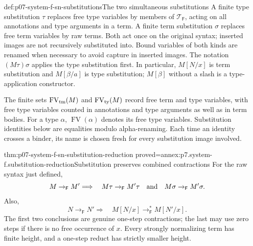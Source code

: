 \begin{hbdefinition}{def:p07-system-f-sn-substitutions}{The two simultaneous substitutions}
A finite type substitution \(\tau\) replaces free type variables by
members of \(\mathcal T_{\mathsf F}\), acting on all annotations and
type arguments in a term. A finite term substitution \(\sigma\) replaces
free term variables by raw terms. Both act once on the original syntax;
inserted images are not recursively substituted into. Bound variables of
both kinds are renamed when necessary to avoid capture in inserted images.
The notation \((M\tau)\sigma\) applies the type substitution first.
In particular, \(M[N/x]\) is term substitution and \(M[\beta/a]\)
is type substitution; \(M[\beta]\) without a slash is a type-application
constructor.

The finite sets \(\operatorname{FV}_{\rm tm}(M)\) and
\(\operatorname{FV}_{\rm ty}(M)\) record free term and type variables,
with free type variables counted in annotations and type arguments as well
as in term bodies. For a type \(\alpha\), \(\operatorname{FV}(\alpha)\)
denotes its free type variables. Substitution identities below are equalities modulo
alpha-renaming. Each time an identity crosses a binder, its name is
chosen fresh for every substitution image involved.
\end{hbdefinition}

\begin{hblemma}{thm:p07-system-f-sn-substitution-reduction}
 {proved=annex:p7.system-f.substitution-reduction}{Substitution preserves combined contractions}
For the raw syntax just defined,
\[
 M\to_{\mathsf F}M' \Longrightarrow\quad
 M\tau\to_{\mathsf F}M'\tau\quad\hbox{and}\quad
 M\sigma\to_{\mathsf F}M'\sigma.
\]
Also,
\[
 N\to_{\mathsf F}N' \Longrightarrow\quad
 M[N/x]\to_{\mathsf F}^*M[N'/x].
\]
The first two conclusions are genuine one-step contractions; the last
may use zero steps if there is no free occurrence of \(x\).
Every strongly normalizing term has finite height, and a one-step reduct
has strictly smaller height.
\end{hblemma}

